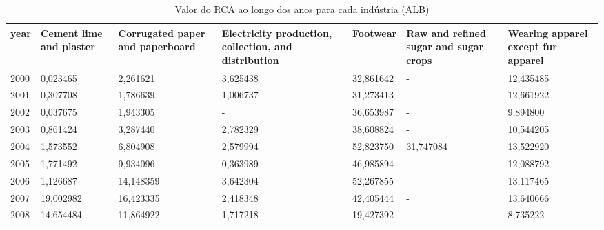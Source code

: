 \begin{table}
\centering
\caption{Valor do RCA ao longo dos anos para cada indústria (ALB)}
\begin{tabular}{p{1cm}p{2cm}p{2cm}p{2cm}p{2cm}p{2cm}p{2cm}}
\toprule
 year &  Cement lime and plaster &  Corrugated paper and paperboard &  Electricity production, collection, and distribution &  Footwear &  Raw and refined sugar and sugar crops &  Wearing apparel except fur apparel \\
\midrule
 2000 &                 0,023465 &                         2,261621 &                                           3,625438 & 32,861642 &                                      - &                           12,435485 \\
 2001 &                 0,307708 &                         1,786639 &                                           1,006737 & 31,273413 &                                      - &                           12,661922 \\
 2002 &                 0,037675 &                         1,943305 &                                                  - & 36,653987 &                                      - &                            9,894800 \\
 2003 &                 0,861424 &                         3,287440 &                                           2,782329 & 38,608824 &                                      - &                           10,544205 \\
 2004 &                 1,573552 &                         6,804908 &                                           2,579994 & 52,823750 &                              31,747084 &                           13,522920 \\
 2005 &                 1,771492 &                         9,934096 &                                           0,363989 & 46,985894 &                                      - &                           12,088792 \\
 2006 &                 1,126687 &                        14,148359 &                                           3,642304 & 52,267855 &                                      - &                           13,117465 \\
 2007 &                19,002982 &                        16,423335 &                                           2,418348 & 42,405444 &                                      - &                           13,640666 \\
 2008 &                14,654484 &                        11,864922 &                                           1,717218 & 19,427392 &                                      - &                            8,735222 \\

\end{tabular}
\end{table}
